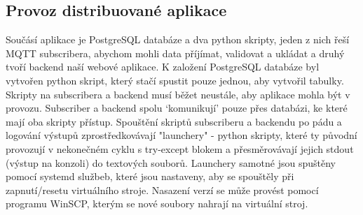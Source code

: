 \subsection{Provoz distribuované aplikace}
Součásí aplikace je PostgreSQL databáze a dva python skripty, jeden z nich řeší MQTT subscribera, abychom mohli data příjímat, validovat a ukládat a druhý tvoří backend naší webové aplikace.
K založení PostgreSQL databáze byl vytvořen python skript, který stačí spustit pouze jednou, aby vytvořil tabulky. Skripty na subscribera a backend musí běžet neustále, aby aplikace mohla být v provozu.
Subscriber a backend spolu `komunikují' pouze přes databázi, ke které mají oba skripty přístup.
Spouštění skriptů subscriberu a backendu po pádu a logování výstupů zprostředkovávají "launchery" - python skripty, které ty původní provozují v nekonečném cyklu s try-except blokem a přesměrovávají jejich stdout (výstup na konzoli) do textových souborů.
Launchery samotné jsou spuštěny pomocí systemd službeb, které jsou nastaveny, aby se spouštěly při zapnutí/resetu virtuálního stroje.
Nasazení verzí se může provést pomocí programu WinSCP, kterým se nové soubory nahrají na virtuální stroj.